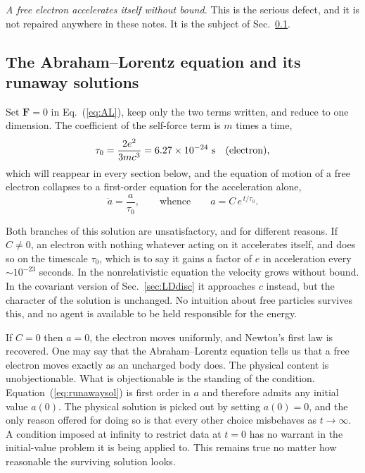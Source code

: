 \documentclass[preprint]{aastex701}
\newcommand{\taunought}{\tau_0}
\begin{document}
\emph{A free electron accelerates itself without bound.} This is the serious
defect, and it is not repaired anywhere in these notes. It is the subject of
Sec.~\ref{sec:runaway}.

\subsection{The Abraham--Lorentz equation and its runaway solutions}
\label{sec:runaway}



Set $\mathbf F = 0$ in Eq.~(\ref{eq:AL}), keep only the two terms written, and
reduce to one dimension. The coefficient of the self-force term is $m$ times a
time,
\begin{equation}
\taunought = \frac{2e^2}{3mc^3} = 6.27\times10^{-24}~{\rm s}
\quad(\text{electron}),
\label{eq:tau0}
\end{equation}
which will reappear in every section below, and the equation of motion of a free
electron collapses to a first-order equation for the acceleration alone,
\begin{equation}
\dot a = \frac{a}{\taunought},
\qquad\text{whence}\qquad
a = C\,e^{\,t/\taunought}.
\label{eq:runawaysol}
\end{equation}

Both branches of this solution are unsatisfactory, and for different reasons.
If $C \neq 0$, an electron with nothing whatever acting on it accelerates
itself, and does so on the timescale $\taunought$, which is to say it gains a
factor of $e$ in acceleration every ${\sim}10^{-23}$ seconds. In the nonrelativistic
equation the velocity grows without bound. In the covariant version of
Sec.~\ref{sec:LDdisc} it approaches $c$ instead, but the character of the
solution is unchanged. No intuition about free particles survives this, and no
agent is available to be held responsible for the energy.

If $C = 0$ then $a = 0$, the electron moves uniformly, and Newton's first law is
recovered. One may say that the Abraham--Lorentz equation tells us that a free
electron moves exactly as an uncharged body does. The physical content is
unobjectionable. What is objectionable is the standing of the condition.
Equation~(\ref{eq:runawaysol}) is first order in $a$ and therefore admits any
initial value $a(0)$. The physical solution is picked out by setting $a(0)=0$,
and the only reason offered for doing so is that every other choice misbehaves
as $t\to\infty$. A condition imposed at infinity to restrict data at $t=0$ has
no warrant in the initial-value problem it is being applied to. This remains
true no matter how reasonable the surviving solution looks.
\end{document}
